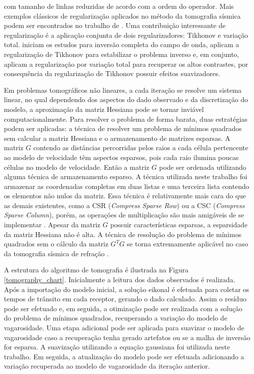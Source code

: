 \noindent com tamanho de linhas reduzidas de acordo com a ordem do operador. Mais exemplos clássicos de regularização aplicados no método da tomografia sísmica podem ser encontrados no trabalho de . Uma contribuição interessante de regularização é a aplicação conjunta de dois regularizadores: Tikhonov e variação total.  iniciam os estudos para inversão completa do campo de onda,  aplicam a regularização de Tikhonov para estabilizar o problema inverso e, em conjunto, aplicam a regularização por variação total para recuperar os altos contrastes, por consequência da regularização de Tikhonov possuir efeitos suavizadores.   

Em problemas tomográficos não lineares, a cada iteração se resolve um sistema linear, no qual dependendo dos aspectos do dado observado e da discretização do modelo, a aproximação da matriz Hessiana pode se tornar inviável computacionalmente. Para resolver o problema de forma barata, duas estratégias podem ser aplicadas: a técnica de resolver um problema de mínimos quadrados sem calcular a matriz Hessiana e o armazenamento de matrizes esparsas. A matriz $G$ contendo as distâncias percorridas pelos raios a cada célula pertencente ao modelo de velocidade têm aspectos esparsos, pois cada raio ilumina poucas células no modelo de velocidade. Então a matriz $G$ pode ser ordenada utilizando alguma técnica de armazenamento esparso. A técnica utilizada neste trabalho foi armazenar as coordenadas completas em duas listas e uma terceira lista contendo os elementos não nulos da matriz. Essa técnica é relativamente mais cara do que as demais existentes, como a CSR (\textit{Compress Sparse Row}) ou a CSC (\textit{Compress Sparse Column}), porém, as operações de multiplicação são mais amigáveis de se implementar \cite{saad2003iterative}. Apesar da matriz $G$ possuir características esparsas, a esparsidade da matriz Hessiana não é alta. A técnica de resolução do problema de mínimos quadrados sem o cálculo da matriz $G^TG$ se torna extremamente aplicável no caso da tomografia sísmica de refração \cite{hestenes1952methods, saad2003iterative, capucci2013tomografia}.

A estrutura do algoritmo de tomografia é ilustrada na Figura \ref{tomography_chart}. Inicialmente a leitura dos dados observados é realizada. Após a importação do modelo inicial, a solução eikonal é efetuada para coletar os tempos de trânsito em cada receptor, gerando o dado calculado. Assim o resíduo pode ser efetuado e, em seguida, a otimização pode ser realizada com a solução do problema de mínimos quadrados, recuperando a variação do modelo de vagarosidade. Uma etapa adicional pode ser aplicada para suavizar o modelo de vagarosidade caso a recuperação tenha gerado artefatos ou se a malha de inversão for esparsa. A suavização utilizando a equação gaussiana foi utilizada neste trabalho. Em seguida, a atualização do modelo pode ser efetuada adicionando a variação recuperada ao modelo de vagarosidade da iteração anterior. 
     
